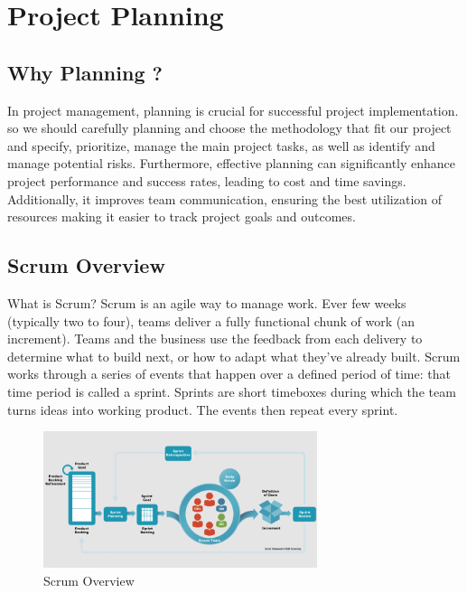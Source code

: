 \chapter{Project Planning}

\section{Why Planning ?}
In project management, planning is crucial for successful project implementation. so we should carefully planning and choose the methodology that fit our project and specify, prioritize, manage the main project tasks, as well as identify and manage potential risks.
Furthermore, effective planning can significantly enhance project performance and success rates, leading to cost and time savings. Additionally, it improves team communication, ensuring the best utilization of resources making it easier to track project goals and outcomes.

\section{Scrum Overview}
What is Scrum? Scrum is an agile way to manage work. Ever few weeks (typically two to four), teams deliver a fully functional chunk of work (an increment). Teams and the business use the feedback from each delivery to determine what to build next, or how to adapt what they've already built.
Scrum works through a series of events that happen over a defined period of time: that time period is called a sprint. Sprints are short timeboxes during which the team turns ideas into working product. The events then repeat every sprint.
\begin{figure}[h!]
	\centering
	\includegraphics[width=\textwidth, height=4cm]{figures/scrum-overview.png}
	\caption{Scrum Overview}
\end{figure}


\newpage 

